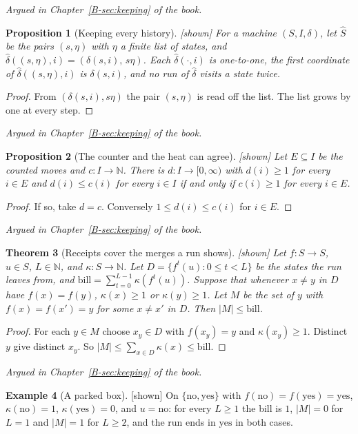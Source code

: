 \documentclass[11pt, a4paper]{article}
\theoremstyle{plain}
\newtheorem{theorem}{Theorem}[section]
\newtheorem{proposition}[theorem]{Proposition}
\theoremstyle{definition}
\newtheorem{example}[theorem]{Example}
\theoremstyle{remark}
\newcommand{\N}{\mathbb{N}}
\newcommand{\step}{\delta}
\newcommand{\cost}{c}
\newcommand{\argued}[1]{\par\noindent\textit{Argued in Chapter~\ref{B-#1} of the book.}\par}
\newcommand{\kind}[1]{\textup{[#1]}}
\begin{document}
\argued{sec:keeping}

\begin{proposition}[Keeping every history]\label{spec:history} \kind{shown}
For a machine $(S,I,\step)$, let $\hat S$ be the pairs $(s,\eta)$ with $\eta$ a finite list of states, and
$\hat\step((s,\eta),i)=(\step(s,i),\,s\eta)$. Each $\hat\step(\cdot,i)$ is one-to-one, the first coordinate of
$\hat\step((s,\eta),i)$ is $\step(s,i)$, and no run of $\hat\step$ visits a state twice.
\end{proposition}

\begin{proof}
From $(\step(s,i),s\eta)$ the pair $(s,\eta)$ is read off the list. The list grows by one at every step.
\end{proof}

\argued{sec:keeping}

\begin{proposition}[The counter and the heat can agree]\label{spec:calibrated} \kind{shown}
Let $E\subseteq I$ be the counted moves and $\cost:I\to\N$. There is $d:I\to[0,\infty)$ with $d(i)\ge1$ for
every $i\in E$ and $d(i)\le\cost(i)$ for every $i\in I$ if and only if $\cost(i)\ge1$ for every $i\in E$.
\end{proposition}

\begin{proof}
If so, take $d=\cost$. Conversely $1\le d(i)\le\cost(i)$ for $i\in E$.
\end{proof}

\argued{sec:keeping}

\begin{theorem}[Receipts cover the merges a run shows]\label{spec:receipts} \kind{shown}
Let $f:S\to S$, $u\in S$, $L\in\N$, and $\kappa:S\to\N$. Let $D=\{f^t(u):0\le t<L\}$ be the states the run
leaves from, and $\mathrm{bill}=\sum_{t=0}^{L-1}\kappa(f^t(u))$. Suppose that whenever $x\ne y$ in $D$ have
$f(x)=f(y)$, $\kappa(x)\ge1$ or $\kappa(y)\ge1$. Let $M$ be the set of $y$ with $f(x)=f(x')=y$ for some $x\ne x'$
in $D$. Then $|M|\le\mathrm{bill}$.
\end{theorem}

\begin{proof}
For each $y\in M$ choose $x_y\in D$ with $f(x_y)=y$ and $\kappa(x_y)\ge1$. Distinct $y$ give distinct $x_y$. So
$|M|\le\sum_{x\in D}\kappa(x)\le\mathrm{bill}$.
\end{proof}

\argued{sec:keeping}

\begin{example}[A parked box]\label{spec:parked} \kind{shown}
On $\{\mathrm{no},\mathrm{yes}\}$ with $f(\mathrm{no})=f(\mathrm{yes})=\mathrm{yes}$, $\kappa(\mathrm{no})=1$,
$\kappa(\mathrm{yes})=0$, and $u=\mathrm{no}$: for every $L\ge1$ the bill is $1$, $|M|=0$ for $L=1$ and
$|M|=1$ for $L\ge2$, and the run ends in $\mathrm{yes}$ in both cases.
\end{example}
\end{document}
